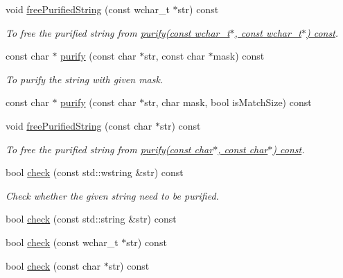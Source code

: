 \begin{DoxyCompactItemize}
\item 
void \hyperlink{classlakoo_1_1_text_purifier_ae7538cf80a89eab28e645cd2a917ace3}{free\+Purified\+String} (const wchar\+\_\+t $\ast$str) const
\begin{DoxyCompactList}\small\item\em To free the purified string from \hyperlink{classlakoo_1_1_text_purifier_aa17c1206115640f6f7556220639bdddc}{purify(const wchar\+\_\+t$\ast$, const wchar\+\_\+t$\ast$) const}. \end{DoxyCompactList}\item 
const char $\ast$ \hyperlink{classlakoo_1_1_text_purifier_aacd5ea50d3d7cb6e800e40252fbc617b}{purify} (const char $\ast$str, const char $\ast$mask) const
\begin{DoxyCompactList}\small\item\em To purify the string with given mask. \end{DoxyCompactList}\item 
const char $\ast$ \hyperlink{classlakoo_1_1_text_purifier_a6798b4b235afa57f83fd8cb0b6ed929d}{purify} (const char $\ast$str, char mask, bool is\+Match\+Size) const
\item 
void \hyperlink{classlakoo_1_1_text_purifier_abef9e8819d7b575cf279ce363ec67254}{free\+Purified\+String} (const char $\ast$str) const
\begin{DoxyCompactList}\small\item\em To free the purified string from \hyperlink{classlakoo_1_1_text_purifier_aacd5ea50d3d7cb6e800e40252fbc617b}{purify(const char$\ast$, const char$\ast$) const}. \end{DoxyCompactList}\item 
bool \hyperlink{classlakoo_1_1_text_purifier_a243df60bae7d8d98a289dbe5c0f85e89}{check} (const std\+::wstring \&str) const
\begin{DoxyCompactList}\small\item\em Check whether the given string need to be purified. \end{DoxyCompactList}\item 
bool \hyperlink{classlakoo_1_1_text_purifier_a7448ae6b4505878099d20e18ad410189}{check} (const std\+::string \&str) const
\item 
bool \hyperlink{classlakoo_1_1_text_purifier_a866cf8a31c43496db79eac05b334dbf3}{check} (const wchar\+\_\+t $\ast$str) const
\item 
bool \hyperlink{classlakoo_1_1_text_purifier_a2cf26b4a8fcb5cf8ea4b4598e56771dd}{check} (const char $\ast$str) const
\end{DoxyCompactItemize}


